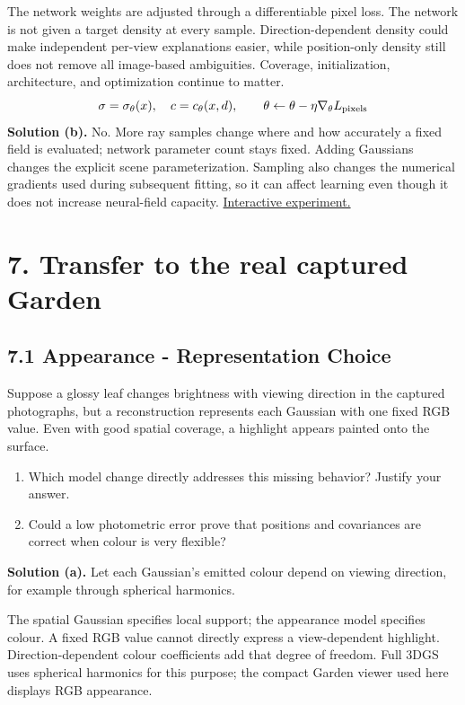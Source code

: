 \documentclass[11pt,a4paper]{article}
\begin{document}
The network weights are adjusted through a differentiable pixel loss.
The network is not given a target density at every sample.
Direction-dependent density could make independent per-view explanations easier, while position-only density still does not remove all image-based ambiguities.
Coverage, initialization, architecture, and optimization continue to matter.
\[
\sigma=\sigma_\theta(x),\quad c=c_\theta(x,d),\qquad\theta\leftarrow\theta-\eta\nabla_\theta L_{\rm pixels}
\]
\noindent\textbf{Solution (b).} No.
More ray samples change where and how accurately a fixed field is evaluated; network parameter count stays fixed.
Adding Gaussians changes the explicit scene parameterization.
Sampling also changes the numerical gradients used during subsequent fitting, so it can affect learning even though it does not increase neural-field capacity.
\noindent\href{https://sosekie.github.io/Unibe-CVG-CV-Interactive-Labs/tutorial-09/#nerf}{Interactive experiment.}
\par{}\section*{7. Transfer to the real captured Garden}
\subsection*{7.1 Appearance - Representation Choice}
Suppose a glossy leaf changes brightness with viewing direction in the captured photographs, but a reconstruction represents each Gaussian with one fixed RGB value.
Even with good spatial coverage, a highlight appears painted onto the surface.
\begin{enumerate}[label=(\alph*),nosep]
\item Which model change directly addresses this missing behavior?
Justify your answer.
\item Could a low photometric error prove that positions and covariances are correct when colour is very flexible?
\end{enumerate}
\noindent\textbf{Solution (a).} Let each Gaussian’s emitted colour depend on viewing direction, for example through spherical harmonics.

The spatial Gaussian specifies local support; the appearance model specifies colour.
A fixed RGB value cannot directly express a view-dependent highlight.
Direction-dependent colour coefficients add that degree of freedom.
Full 3DGS uses spherical harmonics for this purpose; the compact Garden viewer used here displays RGB appearance.
\end{document}

